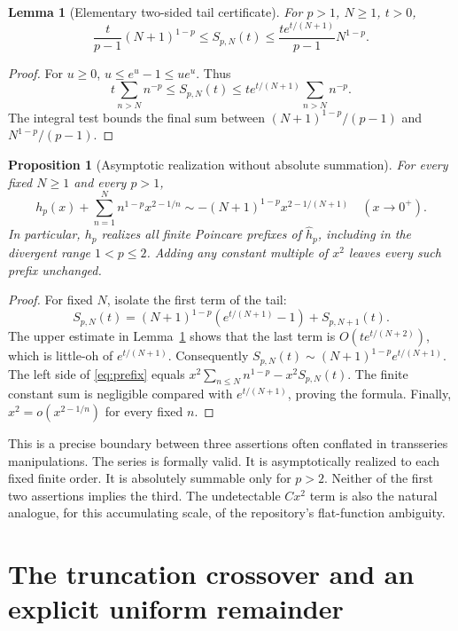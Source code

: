 \documentclass[11pt,a4paper]{article}
\numberwithin{equation}{section}
\newtheorem{proposition}[theorem]{Proposition}
\newtheorem{lemma}[theorem]{Lemma}
\theoremstyle{definition}
\theoremstyle{remark}
\begin{document}
\begin{lemma}[Elementary two-sided tail certificate]\label{lem:tail}
For $p>1$, $N\geq1$, $t>0$,
\begin{equation}\label{eq:tail-bounds}
 \frac{t}{p-1}(N+1)^{1-p}
 \leq S_{p,N}(t)
 \leq\frac{t e^{t/(N+1)}}{p-1}N^{1-p}.
\end{equation}
\end{lemma}
\begin{proof}
For $u\geq0$, $u\leq e^u-1\leq ue^u$. Thus
\[
 t\sum_{n>N}n^{-p}\leq S_{p,N}(t)
   \leq t e^{t/(N+1)}\sum_{n>N}n^{-p}.
\]
The integral test bounds the final sum between
$(N+1)^{1-p}/(p-1)$ and $N^{1-p}/(p-1)$.
\end{proof}

\begin{proposition}[Asymptotic realization without absolute summation]
\label{prop:prefix}
For every fixed $N\geq1$ and every $p>1$,
\begin{equation}\label{eq:prefix}
 h_p(x)+\sum_{n=1}^{N}n^{1-p}x^{2-1/n}
 \sim -(N+1)^{1-p}x^{2-1/(N+1)}
 \quad(x\to0^+).
\end{equation}
In particular, $h_p$ realizes all finite Poincare prefixes of
$\widehat h_p$, including in the divergent range $1<p\leq2$.
Adding any constant multiple of $x^2$ leaves every such prefix unchanged.
\end{proposition}
\begin{proof}
For fixed $N$, isolate the first term of the tail:
\[
 S_{p,N}(t)=(N+1)^{1-p}(e^{t/(N+1)}-1)+S_{p,N+1}(t).
\]
The upper estimate in Lemma~\ref{lem:tail} shows that the last term is
$O(t e^{t/(N+2)})$, which is little-oh of $e^{t/(N+1)}$.
Consequently $S_{p,N}(t)\sim(N+1)^{1-p}e^{t/(N+1)}$.
The left side of \eqref{eq:prefix} equals
$x^2\sum_{n\leq N}n^{1-p}-x^2S_{p,N}(t)$. The finite constant sum is
negligible compared with $e^{t/(N+1)}$, proving the formula.
Finally, $x^2=o(x^{2-1/n})$ for every fixed $n$.
\end{proof}

This is a precise boundary between three assertions often conflated in
transseries manipulations. The series is formally valid. It is asymptotically
realized to each fixed finite order. It is absolutely summable only for
$p>2$. Neither of the first two assertions implies the third. The
undetectable $Cx^2$ term is also the natural analogue, for this accumulating
scale, of the repository's flat-function ambiguity.

\section{The truncation crossover and an explicit uniform remainder}
\label{sec:crossover}
\end{document}
